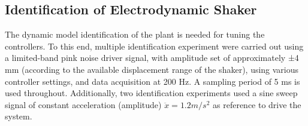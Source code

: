 \documentclass[  10pt, twoside]{report} %
\numberwithin{equation}{chapter}
\begin{document}

\subsection{Identification of Electrodynamic Shaker}

The dynamic model identification of the plant is needed for tuning the controllers. To this end, multiple identification experiment were carried out using a limited-band pink noise driver signal, with amplitude set of approximately ±4 mm (according to the available displacement range of the shaker), using various controller settings, and data acquisition at 200 Hz. A sampling period of 5 ms is used throughout. Additionally, two identification experiments used a sine sweep signal of constant acceleration (amplitude) $\ddot{x} = 1.2 m/s^2$ as reference to drive the system.
\end{document}
